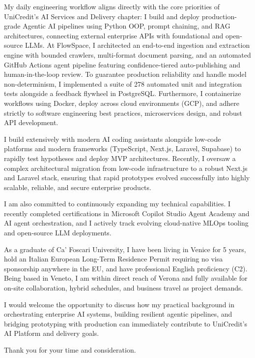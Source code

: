 \documentclass[10pt,a4paper]{article}
\begin{document}
My daily engineering workflow aligns directly with the core priorities of UniCredit's AI Services and Delivery chapter: I build and deploy production-grade Agentic AI pipelines using Python OOP, prompt chaining, and RAG architectures, connecting external enterprise APIs with foundational and open-source LLMs. At FlowSpace, I architected an end-to-end ingestion and extraction engine with bounded crawlers, multi-format document parsing, and an automated GitHub Actions agent pipeline featuring confidence-tiered auto-publishing and human-in-the-loop review. To guarantee production reliability and handle model non-determinism, I implemented a suite of 278 automated unit and integration tests alongside a feedback flywheel in PostgreSQL. Furthermore, I containerize workflows using Docker, deploy across cloud environments (GCP), and adhere strictly to software engineering best practices, microservices design, and robust API development.

I build extensively with modern AI coding assistants alongside low-code platforms and modern frameworks (TypeScript, Next.js, Laravel, Supabase) to rapidly test hypotheses and deploy MVP architectures. Recently, I oversaw a complex architectural migration from low-code infrastructure to a robust Next.js and Laravel stack, ensuring that rapid prototypes evolved successfully into highly scalable, reliable, and secure enterprise products.

I am also committed to continuously expanding my technical capabilities. I recently completed certifications in Microsoft Copilot Studio Agent Academy and AI agent orchestration, and I actively track evolving cloud-native MLOps tooling and open-source LLM deployments.

As a graduate of Ca' Foscari University, I have been living in Venice for 5 years, hold an Italian European Long-Term Residence Permit requiring no visa sponsorship anywhere in the EU, and have professional English proficiency (C2). Being based in Veneto, I am within direct reach of Verona and fully available for on-site collaboration, hybrid schedules, and business travel as project demands.

I would welcome the opportunity to discuss how my practical background in orchestrating enterprise AI systems, building resilient agentic pipelines, and bridging prototyping with production can immediately contribute to UniCredit's AI Platform and delivery goals.

\vspace{0.6em}
Thank you for your time and consideration.
\end{document}
